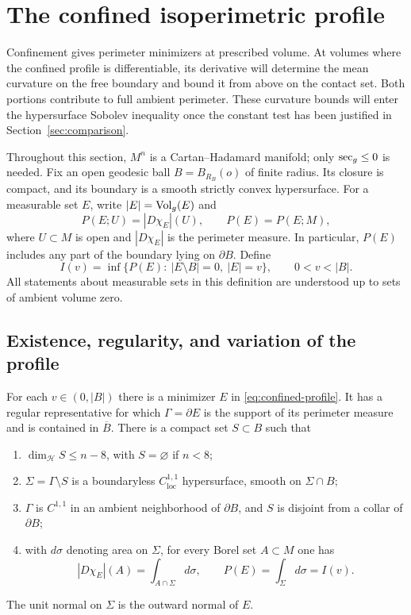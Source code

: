 \section{The confined isoperimetric profile}
\label{sec:profile}

Confinement gives perimeter minimizers at prescribed volume. At volumes
where the confined profile is differentiable, its derivative will determine
the mean curvature on the free boundary and bound it from above on the
contact set. Both portions contribute to full ambient perimeter. These
curvature bounds will enter the hypersurface Sobolev inequality once the
constant test has been justified in Section~\ref{sec:comparison}.

Throughout this section, $M^n$ is a Cartan--Hadamard manifold; only
$\operatorname{sec}_g\le0$ is needed. Fix an open geodesic ball
$B=B_{R_B}(o)$ of finite radius. Its closure is compact, and its
boundary is a smooth strictly convex hypersurface. For a measurable set
$E$, write $|E|=\operatorname{Vol}_g(E)$ and
\[
 P(E;U)=|D\chi_E|(U),\qquad P(E)=P(E;M),
\]
where $U\subset M$ is open and $|D\chi_E|$ is the perimeter measure.
In particular, $P(E)$ includes any part of the boundary lying on
$\partial B$.  Define
\begin{equation}
 \label{eq:confined-profile}
 I(v)=\inf\bigl\{P(E):\ |E\setminus B|=0,\ |E|=v\bigr\},
 \qquad 0<v<|B|.
\end{equation}
All statements about measurable sets in this definition are understood
up to sets of ambient volume zero.


\subsection{Existence, regularity, and variation of the profile}

\begin{proposition}
 \label{prop:confined-regularity}
For each $v\in(0,|B|)$ there is a minimizer $E$ in
\eqref{eq:confined-profile}.  It has a regular representative for which
$\Gamma=\partial E$ is the support of its perimeter measure and is
contained in $\overline B$.  There is a compact set $S\subset B$ such
that
\begin{enumerate}
 \item $\dim_{\mathcal H}S\le n-8$, with $S=\varnothing$ if $n<8$;
 \item $\Sigma=\Gamma\setminus S$ is a boundaryless
 $C^{1,1}_{\mathrm{loc}}$ hypersurface, smooth on $\Sigma\cap B$;
 \item $\Gamma$ is $C^{1,1}$ in an ambient neighborhood of
 $\partial B$, and $S$ is disjoint from a collar of $\partial B$;
 \item with $d\sigma$ denoting area on $\Sigma$, for every Borel set
 $A\subset M$ one has
 \begin{equation}
  \label{eq:perimeter-area}
  |D\chi_E|(A)=\int_{A\cap\Sigma}d\sigma,
  \qquad P(E)=\int_\Sigma d\sigma=I(v).
 \end{equation}
\end{enumerate}
The unit normal on $\Sigma$ is the outward normal of $E$.
\end{proposition}

